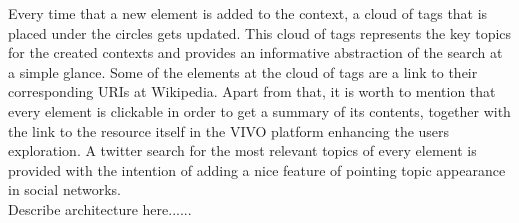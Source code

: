 Every time that a new element is added to the context, a cloud of tags that is placed under the circles gets updated. This cloud of tags represents the key topics for the created contexts and provides an informative abstraction of the search at a simple glance. Some of the elements at the cloud of tags are a link to their corresponding URIs at Wikipedia.
Apart from that, it is worth to mention that every element is clickable in order to get a summary of its contents, together with the link to the resource itself in the VIVO platform enhancing the users exploration. A twitter search for the most relevant topics of every element is provided with the intention of adding a nice feature of pointing topic appearance in social networks.\\
Describe architecture here......

